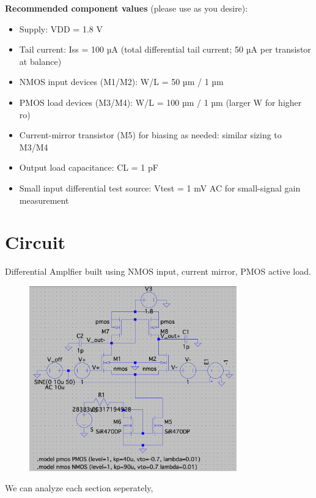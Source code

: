 \documentclass[12pt,a4paper]{article}
\begin{document}
\textbf{Recommended component values} (please use as you desire): 
\begin{itemize}

    \item Supply: VDD = 1.8 V
    \item Tail current: Iss = 100 µA (total differential tail current; 50 µA per transistor at balance)
    \item NMOS input devices (M1/M2): W/L = 50 µm / 1 µm
    \item PMOS load devices (M3/M4): W/L = 100 µm / 1 µm (larger W for higher ro)
    \item Current-mirror transistor (M5) for biasing as needed: similar sizing to M3/M4
    \item Output load capacitance: CL = 1 pF
    \item Small input differential test source: Vtest = 1 mV AC for small-signal gain measurement
\end{itemize} 

\vspace{14pt}
\pagebreak
\section{Circuit}
\vspace{5pt}
\noindent
Differential Amplfier built using NMOS input, current mirror, PMOS active load.
\vspace{8pt}

\begin{figure}[ht!]
	\centering
	\includegraphics[width=0.8\textwidth]{figs/ckt.png}
\end{figure}
We can analyze each section seperately,
\end{document}
